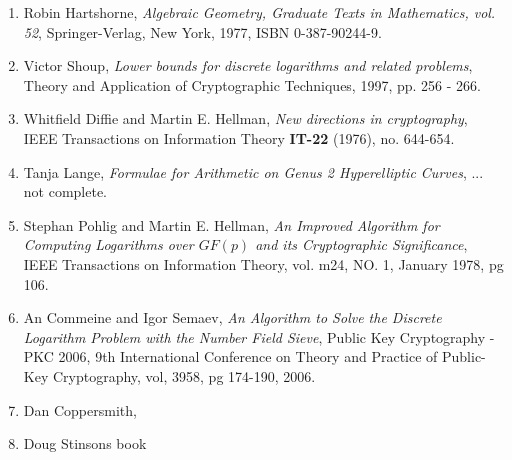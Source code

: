 

\begin{enumerate}[1]
	\item \label{Hartshorne} Robin Hartshorne, \textit{Algebraic Geometry, Graduate Texts in Mathematics, vol. 52}, Springer-Verlag, New York, 1977, ISBN 0-387-90244-9.   
	
	\item \label{VictorShoup} Victor Shoup, \textit{Lower bounds for discrete logarithms and related problems}, Theory and Application of Cryptographic Techniques, 1997, pp. 256 - 266. 
	
	\item \label{WhitfieldDiffieMartinHellman} Whitfield Diffie and Martin E. Hellman, \textit{New directions in cryptography}, IEEE Transactions on Information Theory \textbf{IT-22} (1976), no. 644-654.  

	\item \label{TanjaLange} Tanja Lange, \textit{Formulae for Arithmetic on Genus 2 Hyperelliptic Curves}, ... not complete.

	\item \label{PohligHellman} Stephan Pohlig and Martin E. Hellman, \textit{An Improved Algorithm for Computing Logarithms over $GF(p)$ and its Cryptographic Significance}, IEEE Transactions on Information Theory, vol. m24, NO. 1, January 1978, pg 106.  

	\item \label{NFStoDLP} An Commeine and Igor Semaev, \textit{An Algorithm to Solve the Discrete Logarithm Problem with the Number Field Sieve}, Public Key Cryptography - PKC 2006, 9th International Conference on Theory and Practice of Public-Key Cryptography, vol, 3958, pg 174-190, 2006. 

	\item \label{DanCoppersmith} Dan Coppersmith, 

	\item \label{DougStinson} Doug Stinsons book
\end{enumerate}